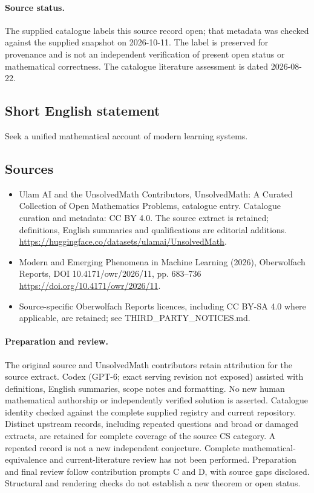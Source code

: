 \documentclass[11pt]{article}
\begin{document}
\paragraph{Source status.}
The supplied catalogue labels this source record open; that metadata was checked against the supplied snapshot on 2026-10-11. The label is preserved for provenance and is not an independent verification of present open status or mathematical correctness. The catalogue literature assessment is dated 2026-08-22.
\subsection{Short English statement}
Seek a unified mathematical account of modern learning systems.
\subsection{Sources}
\begin{itemize}
\item[S1] Ulam AI and the UnsolvedMath Contributors, UnsolvedMath: A Curated Collection of Open Mathematics Problems, catalogue entry. Catalogue curation and metadata: CC BY 4.0. The source extract is retained; definitions, English summaries and qualifications are editorial additions.
\url{https://huggingface.co/datasets/ulamai/UnsolvedMath}.
\item[S2] Modern and Emerging Phenomena in Machine Learning (2026), Oberwolfach Reports, DOI 10.4171/owr/2026/11, pp. 683--736
\url{https://doi.org/10.4171/owr/2026/11}.
\item Source-specific Oberwolfach Reports licences, including CC BY-SA 4.0 where applicable, are retained; see THIRD\_PARTY\_NOTICES.md.
\end{itemize}
\paragraph{Preparation and review.}
The original source and UnsolvedMath contributors retain attribution for the source extract. Codex (GPT-6; exact serving revision not exposed) assisted with definitions, English summaries, scope notes and formatting. No new human mathematical authorship or independently verified solution is asserted. Catalogue identity checked against the complete supplied registry and current repository. Distinct upstream records, including repeated questions and broad or damaged extracts, are retained for complete coverage of the source CS category. A repeated record is not a new independent conjecture. Complete mathematical-equivalence and current-literature review has not been performed. Preparation and final review follow contribution prompts C and D, with source gaps disclosed. Structural and rendering checks do not establish a new theorem or open status.
\label{end:statement}
\end{document}
